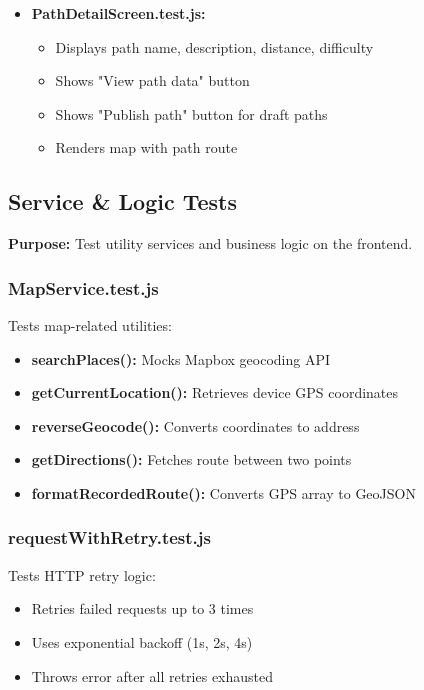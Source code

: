 \begin{itemize}
    \item \textbf{PathDetailScreen.test.js:}
    \begin{itemize}
        \item Displays path name, description, distance, difficulty
        \item Shows "View path data" button
        \item Shows "Publish path" button for draft paths
        \item Renders map with path route
    \end{itemize}
\end{itemize}

\subsection{Service \& Logic Tests}
\label{subsec:service_logic_tests}

\textbf{Purpose:} Test utility services and business logic on the frontend.

\subsubsection{MapService.test.js}
\label{subsubsec:map_service_test}

Tests map-related utilities:
\begin{itemize}
    \item \textbf{searchPlaces():} Mocks Mapbox geocoding API
    \item \textbf{getCurrentLocation():} Retrieves device GPS coordinates
    \item \textbf{reverseGeocode():} Converts coordinates to address
    \item \textbf{getDirections():} Fetches route between two points
    \item \textbf{formatRecordedRoute():} Converts GPS array to GeoJSON
\end{itemize}

\subsubsection{requestWithRetry.test.js}
\label{subsubsec:request_retry_test}

Tests HTTP retry logic:
\begin{itemize}
    \item Retries failed requests up to 3 times
    \item Uses exponential backoff (1s, 2s, 4s)
    \item Throws error after all retries exhausted
\end{itemize}

